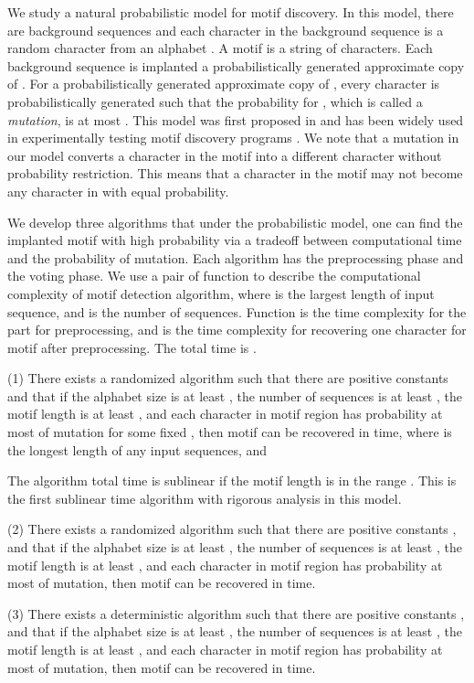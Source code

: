 \documentclass[11pt]{article}
\begin{document}
We study a natural probabilistic model for motif discovery. In this
model, there are  background sequences and each character in the
background sequence is a random character from an alphabet .
A motif  is a string of  characters. Each
background sequence is implanted a probabilistically generated
approximate copy of  .  For a probabilistically  generated
approximate copy  of , every character  is
probabilistically  generated such that the probability for , which is called a {\it mutation}, is at most . This
model was first proposed in \cite{PevznerSze00} and has been widely
used in experimentally testing motif discovery programs
\cite{KeichPevzner02,KeichPevzner02b,WangDong05,ChinLeung05}. We
note that a mutation in our model converts a character  in  the
motif into a different character  without probability
restriction. This means that a character  in the motif may not
become any character  in  with equal
probability.

We develop three algorithms that under the probabilistic model, one
can find the implanted motif with high probability via a tradeoff
between computational time and the probability of mutation. Each
algorithm has the preprocessing phase and the voting phase. We use a
pair of function  to describe the
computational complexity of motif detection algorithm, where  is
the largest length of input sequence, and  is the number of
sequences. Function  is the time complexity for the part
for preprocessing,  and  is the time complexity for
recovering one character for motif after preprocessing. The total
time is .

(1) There exists a randomized algorithm such that there are positive
constants  and  that if the alphabet size is at least ,
the number of sequences is at least , the motif length is
at least , and each character in motif region has
probability at most  of mutation for some
fixed , then motif can be recovered in  time, where
 is the longest length of any input sequences, and

 The algorithm total time is sublinear if the motif
length  is in the range  . This is the first sublinear time algorithm with
rigorous analysis in this model.

(2) There exists a randomized algorithm such that there are positive
constants , and  that if the alphabet size is at
least , the number of sequences is at least , the
motif length is at least , and each character in motif
region has probability at most  of mutation, then motif can
be recovered in 
time.

(3) There exists a deterministic algorithm such that there are
positive constants , and  that if the alphabet
size is at least , the number of sequences is at least , the motif length is at least , and each character in
motif region has probability at most  of mutation, then
motif can be recovered in 
time.
\end{document}
